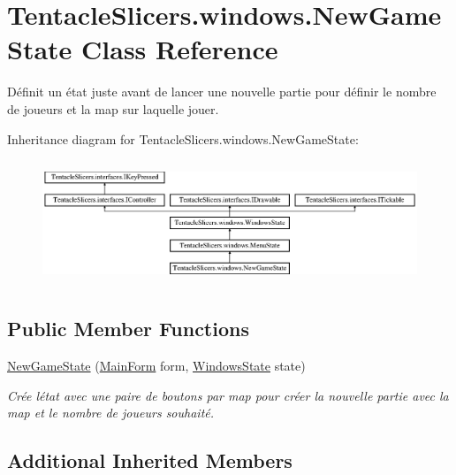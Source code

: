 \hypertarget{class_tentacle_slicers_1_1windows_1_1_new_game_state}{}\section{Tentacle\+Slicers.\+windows.\+New\+Game\+State Class Reference}
\label{class_tentacle_slicers_1_1windows_1_1_new_game_state}


Définit un état juste avant de lancer une nouvelle partie pour définir le nombre de joueurs et la map sur laquelle jouer.  


Inheritance diagram for Tentacle\+Slicers.\+windows.\+New\+Game\+State\+:\begin{figure}[H]
\begin{center}
\leavevmode
\includegraphics[height=3.763441cm]{class_tentacle_slicers_1_1windows_1_1_new_game_state}
\end{center}
\end{figure}
\subsection*{Public Member Functions}
\begin{DoxyCompactItemize}
\item 
\hyperlink{class_tentacle_slicers_1_1windows_1_1_new_game_state_a54b472f60f84b2aa2c150257d58a8dc4}{New\+Game\+State} (\hyperlink{class_tentacle_slicers_1_1windows_1_1_main_form}{Main\+Form} form, \hyperlink{class_tentacle_slicers_1_1windows_1_1_windows_state}{Windows\+State} state)
\begin{DoxyCompactList}\small\item\em Crée l\textquotesingle{}état avec une paire de boutons par map pour créer la nouvelle partie avec la map et le nombre de joueurs souhaité. \end{DoxyCompactList}\end{DoxyCompactItemize}
\subsection*{Additional Inherited Members}


